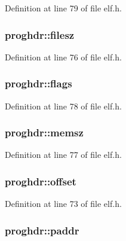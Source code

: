\-Definition at line 79 of file elf.\-h.

\hypertarget{structproghdr_ada45841c63724ee15300232b0317d1c3}{
\subsubsection[{filesz}]{ {\bf proghdr\-::filesz}}}\label{structproghdr_ada45841c63724ee15300232b0317d1c3}


\-Definition at line 76 of file elf.\-h.

\hypertarget{structproghdr_a5129c882410bcae83437e65617a9d0b3}{
\subsubsection[{flags}]{ {\bf proghdr\-::flags}}}\label{structproghdr_a5129c882410bcae83437e65617a9d0b3}


\-Definition at line 78 of file elf.\-h.

\hypertarget{structproghdr_a1d2b052eeb75a24234f4fbb087205f71}{
\subsubsection[{memsz}]{ {\bf proghdr\-::memsz}}}\label{structproghdr_a1d2b052eeb75a24234f4fbb087205f71}


\-Definition at line 77 of file elf.\-h.

\hypertarget{structproghdr_a13ca31beed71b97e906646eb21ab7c43}{
\subsubsection[{offset}]{ {\bf proghdr\-::offset}}}\label{structproghdr_a13ca31beed71b97e906646eb21ab7c43}


\-Definition at line 73 of file elf.\-h.

\hypertarget{structproghdr_aee40352ae868f605ca540d8d7c1ad71d}{
\subsubsection[{paddr}]{ {\bf proghdr\-::paddr}}}\label{structproghdr_aee40352ae868f605ca540d8d7c1ad71d}


